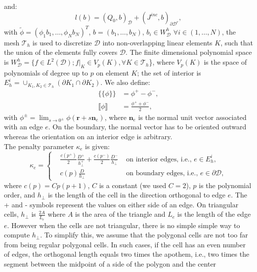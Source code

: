 \documentclass[preprint,10pt]{elsarticle}
\newcommand\br{\mathbf{r}}
\newcommand\bs{\boldsymbol}
\newcommand\ldb{\{\!\!\{}
\newcommand\rdb{\}\!\!\}}
\newcommand\llb{\llbracket}
\newcommand\rrb{\rrbracket}
\newcommand\mc{\mathcal}
\renewcommand{\(}{\left(}
\renewcommand{\)}{\right)}
\renewcommand{\[}{\left[}
\renewcommand{\]}{\right]}
\begin{document}
and:
\begin{equation}
  l(b) = (Q_0,b)_{\mc{D}} + (J^{inc},b)_{\partial
  \mc{D}^r},
\end{equation}
with $\tilde{\phi}=(\phi_1 b_1,\hdots, \phi_N b_N)^T$, $b = (b_1,\hdots,b_N)$,
$b_i \in W_{\mc{D}}^h$ $\forall i \in (1,\hdots,N)$,
the mesh $\mc{T}_h$ is used to discretize $\mc{D}$ into non-overlapping linear
elements $K$, such that the union of the elements fully covers $\mc{D}$. The
finite dimensional polynomial space is $W_{\mc{D}}^h = \{f \in L^2(\mc{D});
f|_K \in V_p(K), \forall K \in \mc{T}_h$\}, where $V_p(K)$ is the space of
polynomials of degree up to $p$ on element $K$; the set of interior is $E_h^i
= \cup _{K_1,K_2\in \mc{T}_h}(\partial K_1 \cap \partial K_2)$. We also
define:
\begin{align}
  \ldb \phi \rdb &= \phi^+ - \phi^-,\\
  \llb \phi \rrb &=  \frac{\phi^++\phi^-}{2},
\end{align}
with $\phi^{\pm} = \lim_{s\rightarrow 0^{\pm}} \phi(\br+s \bs{n}_e)$, where
$\bs{n}_e$ is the normal unit vector associated with an edge $e$. On the boundary, 
the normal vector has to be oriented outward whereas the orientation on an
interior edge is arbitrary.\\
The penalty parameter $\kappa_e$ is given:
\begin{equation}
  \kappa_e = \left\{
    \begin{aligned}
      &\frac{c(p^+)}{2}\frac{D^+}{h_{\bot}^+}+\frac{c(p^-)}{2}
      \frac{D^-}{h_{\bot}^-} & \textrm{ on interior edges, i.e., } e \in
      E_h^i,\\
      & c(p)\frac{D}{h_{\bot}} & \textrm{ on boundary edges, i.e., } e\in
      \partial \mc{D},
    \end{aligned}
    \right.
\end{equation}
where $c(p) =Cp(p+1)$, $C$ is a constant (we used $C=2$), $p$ is the
polynomial order,  and $h_{\bot}$ is the length of the cell in the direction 
orthogonal to edge $e$. The + and - symbols represent the values on either 
side of an edge. On triangular cells, $h_{\bot}$ is $\frac{2A}{L_e}$ where $A$
is the area of the triangle and $L_e$ is the length of the edge $e$. However
when the cells are not triangular, there is no simple simple way to compute
$h_{\bot}$. To simplify this, we assume that the polygonal cells are not too
far from being regular polygonal cells. In such cases, if the cell has an even
number of edges, the orthogonal length equals two times the apothem, i.e., two
times the segment between the midpoint of a side of the polygon and the center
\end{document}
